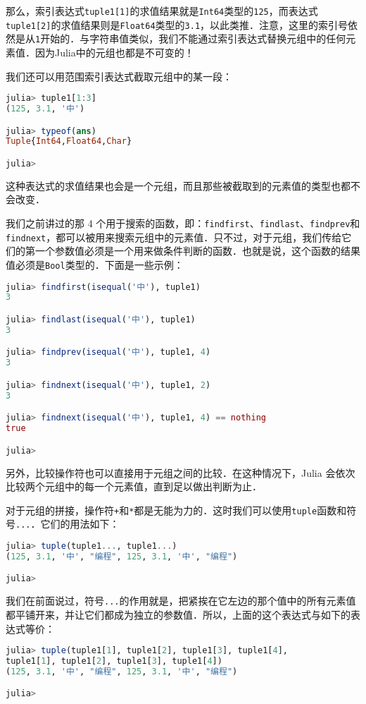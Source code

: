 那么，索引表达式\verb|tuple1[1]|的求值结果就是\verb|Int64|类型的\verb|125|，而表达式\verb|tuple1[2]|的求值结果则是\verb|Float64|类型的\verb|3.1|，以此类推．注意，这里的索引号依然是从\verb|1|开始的．与字符串值类似，我们不能通过索引表达式替换元组中的任何元素值．因为Julia中的元组也都是不可变的！

我们还可以用范围索引表达式截取元组中的某一段：
\begin{lstlisting}[language=julia]
julia> tuple1[1:3]
(125, 3.1, '中')

julia> typeof(ans)
Tuple{Int64,Float64,Char}

julia> 
\end{lstlisting}

这种表达式的求值结果也会是一个元组，而且那些被截取到的元素值的类型也都不会改变．

我们之前讲过的那 4 个用于搜索的函数，即：\verb|findfirst|、\verb|findlast|、\verb|findprev|和\verb|findnext|，都可以被用来搜索元组中的元素值．只不过，对于元组，我们传给它们的第一个参数值必须是一个用来做条件判断的函数．也就是说，这个函数的结果值必须是\verb|Bool|类型的．下面是一些示例：
\begin{lstlisting}[language=julia]
julia> findfirst(isequal('中'), tuple1)
3

julia> findlast(isequal('中'), tuple1)
3

julia> findprev(isequal('中'), tuple1, 4)
3

julia> findnext(isequal('中'), tuple1, 2)
3

julia> findnext(isequal('中'), tuple1, 4) == nothing
true

julia>  
\end{lstlisting}

另外，比较操作符也可以直接用于元组之间的比较．在这种情况下，Julia 会依次比较两个元组中的每一个元素值，直到足以做出判断为止．

对于元组的拼接，操作符\verb|+|和\verb|*|都是无能为力的．这时我们可以使用\verb|tuple|函数和符号\verb|...|．它们的用法如下：
\begin{lstlisting}[language=julia]
julia> tuple(tuple1..., tuple1...)
(125, 3.1, '中', "编程", 125, 3.1, '中', "编程")

julia> 
\end{lstlisting}

我们在前面说过，符号\verb|...|的作用就是，把紧挨在它左边的那个值中的所有元素值都平铺开来，并让它们都成为独立的参数值．所以，上面的这个表达式与如下的表达式等价：
\begin{lstlisting}[language=julia]
julia> tuple(tuple1[1], tuple1[2], tuple1[3], tuple1[4], 
tuple1[1], tuple1[2], tuple1[3], tuple1[4])
(125, 3.1, '中', "编程", 125, 3.1, '中', "编程")

julia> 
\end{lstlisting}

